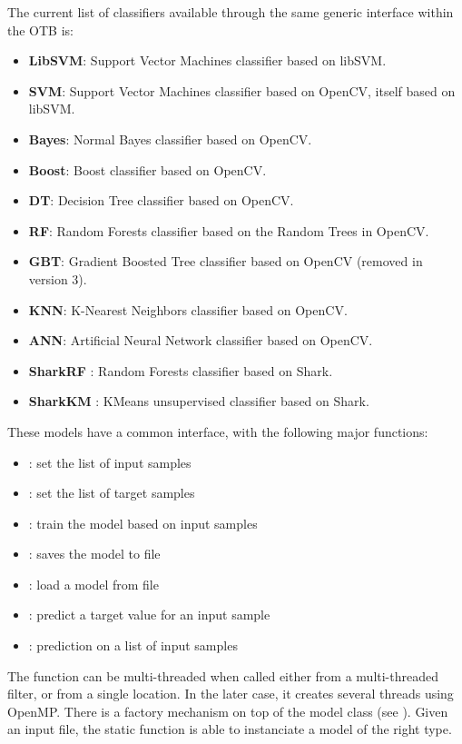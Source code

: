 The current list of classifiers available through the same generic interface within the OTB is:

\begin{itemize}
  \item \textbf{LibSVM}: Support Vector Machines classifier based on libSVM.
  \item \textbf{SVM}: Support Vector Machines classifier based on OpenCV, itself based on libSVM.
  \item \textbf{Bayes}: Normal Bayes classifier based on OpenCV.
  \item \textbf{Boost}: Boost classifier based on OpenCV.
  \item \textbf{DT}: Decision Tree classifier based on OpenCV.
  \item \textbf{RF}: Random Forests classifier based on the Random Trees in OpenCV.
  \item \textbf{GBT}: Gradient Boosted Tree classifier based on OpenCV (removed in version 3).
  \item \textbf{KNN}: K-Nearest Neighbors classifier based on OpenCV.
  \item \textbf{ANN}: Artificial Neural Network classifier based on OpenCV.
  \item \textbf{SharkRF} : Random Forests classifier based on Shark.
  \item \textbf{SharkKM} : KMeans unsupervised classifier based on Shark.
\end{itemize}

These models have a common interface, with the following major functions:
\begin{itemize}
  \item {} : set the list of input samples
  \item {} : set the list of target samples
  \item {} : train the model based on input samples
  \item {} : saves the model to file
  \item {} : load a model from file
  \item {} : predict a target value for an input sample
  \item {} : prediction on a list of input samples
\end{itemize}

The  function can be multi-threaded when
called either from a multi-threaded filter, or from a single location. In
the later case, it creates several threads using OpenMP.
There is a factory mechanism on top of the model class (see
). Given an input file,
the static function  is able
to instanciate a model of the right type.

